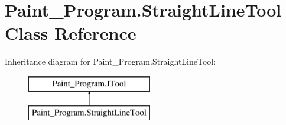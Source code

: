 \hypertarget{class_paint___program_1_1_straight_line_tool}{}\section{Paint\+\_\+\+Program.\+Straight\+Line\+Tool Class Reference}
\label{class_paint___program_1_1_straight_line_tool}
Inheritance diagram for Paint\+\_\+\+Program.\+Straight\+Line\+Tool\+:\begin{figure}[H]
\begin{center}
\leavevmode
\includegraphics[height=2.000000cm]{class_paint___program_1_1_straight_line_tool}
\end{center}
\end{figure}
